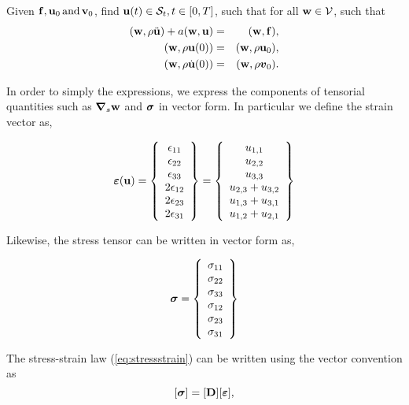 \documentclass[10pt]{article}
\newcommand{\tmmathbf}[1]{\ensuremath{\boldsymbol{#1}}}
\newcommand{\tmop}[1]{\ensuremath{\operatorname{#1}}}
\begin{document}
Given $\force, \bu_0 \tmop{and} \bv_0$, find $\mathbf{u}( t ) \in \mathcal{S}_t, t \in [ 0, T ]$,
such that for all $\mathbf{w} \in \mathcal{V}$, such that 
\begin{eqnarray}
  (\bw, \rho \ddot{\bu} ) + a (\bw,\bu) &
  = & (\bw,\force), \\
  (\bw, \rho \bu( 0 ) ) & = & (\bw, \rho \bu_0 ), \nonumber\\
  (\bw, \rho \dot{\bu} ( 0 ) ) & = & (\bw, \rho \tmmathbf{v}_0 ) \nonumber.
\end{eqnarray}

In order to simply the expressions, we express the components of tensorial quantities such as ${\boldsymbol{\nabla}}_s\mathbf{w}$ and ${\boldsymbol{\sigma}}$ in vector form. In particular we define the strain vector as,  

\[ 
	{\boldsymbol{\varepsilon}}(\mathbf{u}) = 
	\left\{ \begin{array}{c}
	\epsilon_{11} \\ \epsilon_{22} \\ \epsilon_{33} \\
	2\epsilon_{12} \\ 2\epsilon_{23} \\ 2\epsilon_{31}
	\end{array} \right\}  =
	\left\{ \begin{array}{c}
     u_{1, 1}\\
     u_{2, 2}\\
     u_{3, 3}\\
     u_{2, 3} + u_{3, 2}\\
     u_{1, 3} + u_{3, 1}\\
     u_{1, 2} + u_{2, 1}
   \end{array} \right\} 
\]

Likewise, the stress tensor can be written in vector form as,

\[
{\boldsymbol{\sigma}} = \left\{ \begin{array}{c}
	\sigma_{11} \\ \sigma_{22} \\ \sigma_{33} \\
	\sigma_{12} \\ \sigma_{23} \\ \sigma_{31} \end{array} \right\} 
\]

The stress-strain law (\ref{eq:stressstrain}) can be written using the vector convention as
\begin{equation}
\label{ref:stressstrainMat}
[{\boldsymbol{\sigma}}] = [\mathbf{D}][{\boldsymbol{\varepsilon}}],
\end{equation} 
\end{document}
